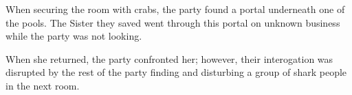 When securing the room with crabs, the party found a portal underneath one of the pools.
The Sister they saved went through this portal on unknown business while the party was not looking.

When she returned, the party confronted her; however, their interogation was disrupted by the rest of the party finding and disturbing a group of shark people in the next room.
